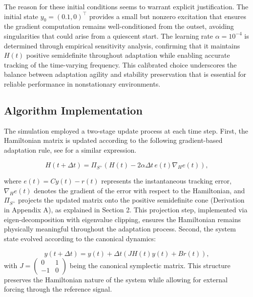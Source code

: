 \documentclass[reqno]{amsart}
\numberwithin{equation}{section}
\begin{document}
The reason for these initial conditions seems to warrant explicit justification. The initial state \(y_0 = (0.1, 0)^\top\) provides a small but nonzero excitation that ensures the gradient computation remains well-conditioned from the outset, avoiding singularities that could arise from a quiescent start. The learning rate \(\alpha = 10^{-4}\) is determined through empirical sensitivity analysis, confirming that it maintains \(H(t)\) positive semidefinite throughout adaptation while enabling accurate tracking of the time-varying frequency. This calibrated choice underscores the balance between adaptation agility and stability preservation that is essential for reliable performance in nonstationary environments.

\subsection{Algorithm Implementation}

The simulation employed a two-stage update process at each time step. First, the Hamiltonian matrix is updated according to the following gradient-based adaptation rule, see \cite{bishop2006prml, hairer2006geometric} for a similar expression.

\begin{equation}
H(t+\Delta t) = \Pi_{S^+}\left(H(t) - 2\alpha \Delta t \, e(t) \nabla_H e(t)\right),
\end{equation}

where $e(t) = C y(t) - r(t)$ represents the instantaneous tracking error, $\nabla_H e(t)$ denotes the gradient of the error with respect to the Hamiltonian, and $\Pi_{S^+}$ projects the updated matrix onto the positive semidefinite cone (Derivation in Appendix A), as explained in Section 2. This projection step, implemented via eigen-decomposition with eigenvalue clipping, ensures the Hamiltonian remains physically meaningful throughout the adaptation process. Second, the system state evolved according to the canonical dynamics:

\begin{equation}
y(t+\Delta t) = y(t) + \Delta t \left(J H(t) y(t) + B r(t)\right),
\end{equation} with $J = \begin{pmatrix} 0 & 1 \\ -1 & 0 \end{pmatrix}$ being the canonical symplectic matrix. This structure preserves the Hamiltonian nature of the system while allowing for external forcing through the reference signal.
\end{document}
